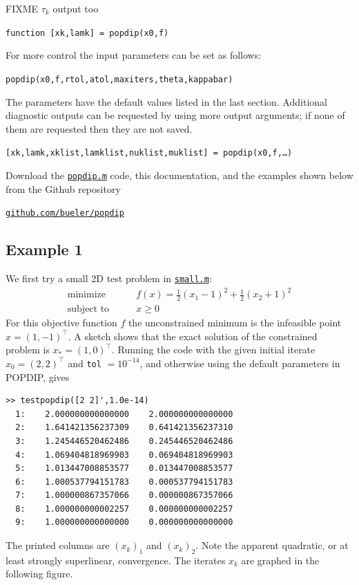 \documentclass[11pt]{article}
\begin{document}
FIXME $\tau_k$ output too

\medskip
\centerline{\texttt{function [xk,lamk] = popdip(x0,f)}}

\medskip
\noindent For more control the input parameters can be set as follows:

\medskip
\centerline{\texttt{popdip(x0,f,rtol,atol,maxiters,theta,kappabar)}}

\medskip
\noindent The parameters have the default values listed in the last section.  Additional diagnostic outputs can be requested by using more output arguments; if none of them are requested then they are not saved.

\medskip
\centerline{\texttt{[xk,lamk,xklist,lamklist,nuklist,muklist] = popdip(x0,f,\dots)}}

\medskip
\noindent Download the \href{https://github.com/bueler/popdip/blob/main/matlab/popdip.m}{\texttt{popdip.m}} code, this documentation, and the examples shown below from the Github repository
\begin{center}
    \href{https://github.com/bueler/popdip}{\texttt{github.com/bueler/popdip}}
\end{center}


\subsection*{Example 1}

We first try a small 2D test problem in \href{https://github.com/bueler/popdip/blob/main/matlab/small.m}{\texttt{small.m}}:
\begin{equation}
\begin{matrix}
\text{minimize} \qquad & f(x) = \frac{1}{2} (x_1-1)^2 + \frac{1}{2} (x_2+1)^2 \\
\text{subject to} \qquad & x \ge 0
\end{matrix} \label{testoneproblem}
\end{equation}
For this objective function $f$ the unconstrained minimum is the infeasible point $\hat x =(1,-1)^\top$.  A sketch shows that the exact solution of the constrained problem is $x_*=(1,0)^\top$.  Running the code with the given initial iterate $x_0=(2,2)^\top$ and \texttt{tol} $=10^{-14}$, and otherwise using the default parameters in POPDIP, gives
\begin{Verbatim}[fontsize=\small]
>> testpopdip([2 2]',1.0e-14)
  1:    2.000000000000000    2.000000000000000
  2:    1.641421356237309    0.641421356237310
  3:    1.245446520462486    0.245446520462486
  4:    1.069404818969903    0.069404818969903
  5:    1.013447008853577    0.013447008853577
  6:    1.000537794151783    0.000537794151783
  7:    1.000000867357066    0.000000867357066
  8:    1.000000000002257    0.000000000002257
  9:    1.000000000000000    0.000000000000000
\end{Verbatim}
The printed columns are $(x_k)_1$ and $(x_k)_2$.  Note the apparent quadratic, or at least strongly superlinear, convergence.  The iterates $x_k$ are graphed in the following figure.
\end{document}
